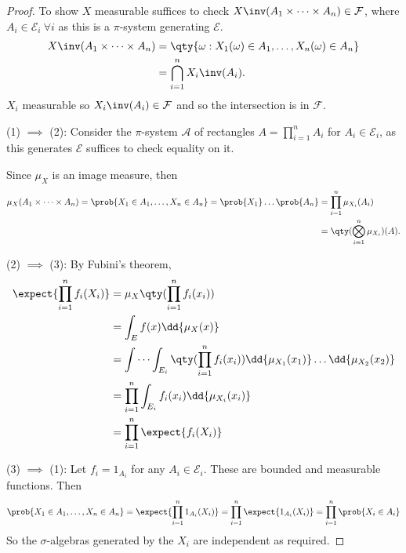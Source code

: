 \begin{proof}
	To show $X$ measurable suffices to check $X\inv(A_1 \times \dots \times A_n) \in \mathcal{F}$, where $A_i \in \mathcal{E}_i \ \forall i$ as this is a $\pi$-system generating $\mathcal{E}$.
	\begin{align*}
		X\inv(A_1 \times \dots \times A_n) &= \qty{\omega : X_1(\omega) \in A_1, \dots, X_n(\omega) \in A_n} \\
		&= \bigcap_{i = 1}^n X_i\inv(A_i).
	\end{align*}
	$X_i$ measurable so $X_i\inv(A_i) \in \mathcal{F}$ and so the intersection is in $\mathcal{F}$.

	(1) $\implies$ (2):
	Consider the $\pi$-system $\mathcal A$ of rectangles $A = \prod_{i=1}^n A_i$ for $A_i \in \mathcal E_i$, as this generates $\mathcal{E}$ suffices to check equality on it.

	Since $\mu_X$ is an image measure, then
	\begin{align*}
		\mu_X(A_1 \times \dots \times A_n) = \prob{X_1 \in A_1, \dots, X_n \in A_n} = \prob{X_1} \dots \prob{A_n} &= \prod_{i=1}^n \mu_{X_i}(A_i) \\
		&= \qty(\bigotimes_{i=1}^n \mu_{X_i})(A).
	\end{align*}

	(2) $\implies$ (3):
	By Fubini's theorem,
	\begin{align*}
		\expect{\prod_{i=1}^n f_i(X_i)} &= \mu_X\qty(\prod_{i=1}^n f_i(x_i)) \\
		&= \int_E f(x) \dd{\mu_X(x)} \\
		&= \idotsint_{E_i} \qty(\prod_{i=1}^n f_i(x_i)) \dd{\mu_{X_1}(x_1)} \dots \dd{\mu_{X_2}(x_2)} \\
		&= \prod_{i=1}^n \int_{E_i} f_i(x_i) \dd{\mu_{X_i}(x_i)} \\
		&= \prod_{i=1}^n \expect{f_i(X_i)}
	\end{align*}

	(3) $\implies$ (1):
	Let $f_i = 1_{A_i}$ for any $A_i \in \mathcal E_i$.
	These are bounded and measurable functions.
	Then
	\[ \prob{X_1 \in A_1, \dots, X_n \in A_n} = \expect{\prod_{i=1}^n 1_{A_i}(X_i)} = \prod_{i=1}^n \expect{1_{A_i}(X_i)} = \prod_{i=1}^n \prob{X_i \in A_i} \]
	So the $\sigma$-algebras generated by the $X_i$ are independent as required.
\end{proof}
